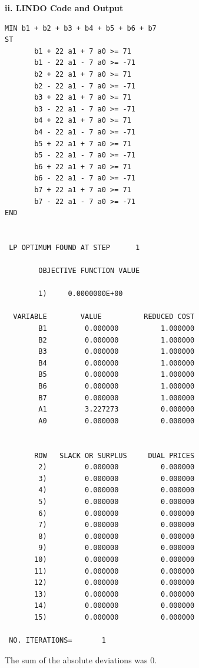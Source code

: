 \documentclass[paper=a4, fontsize=11pt]{scrartcl} %
\numberwithin{equation}{section} %
\numberwithin{figure}{section} %
\numberwithin{table}{section} %
\begin{document}
    \textbf{ii. LINDO Code and Output}\newline
    \begin{verbatim}
MIN b1 + b2 + b3 + b4 + b5 + b6 + b7
ST
	   b1 + 22 a1 + 7 a0 >= 71
	   b1 - 22 a1 - 7 a0 >= -71
	   b2 + 22 a1 + 7 a0 >= 71
	   b2 - 22 a1 - 7 a0 >= -71
	   b3 + 22 a1 + 7 a0 >= 71
	   b3 - 22 a1 - 7 a0 >= -71
	   b4 + 22 a1 + 7 a0 >= 71
	   b4 - 22 a1 - 7 a0 >= -71
	   b5 + 22 a1 + 7 a0 >= 71
	   b5 - 22 a1 - 7 a0 >= -71
	   b6 + 22 a1 + 7 a0 >= 71
	   b6 - 22 a1 - 7 a0 >= -71
	   b7 + 22 a1 + 7 a0 >= 71
	   b7 - 22 a1 - 7 a0 >= -71
END


 LP OPTIMUM FOUND AT STEP      1

        OBJECTIVE FUNCTION VALUE

        1)     0.0000000E+00

  VARIABLE        VALUE          REDUCED COST
        B1         0.000000          1.000000
        B2         0.000000          1.000000
        B3         0.000000          1.000000
        B4         0.000000          1.000000
        B5         0.000000          1.000000
        B6         0.000000          1.000000
        B7         0.000000          1.000000
        A1         3.227273          0.000000
        A0         0.000000          0.000000


       ROW   SLACK OR SURPLUS     DUAL PRICES
        2)         0.000000          0.000000
        3)         0.000000          0.000000
        4)         0.000000          0.000000
        5)         0.000000          0.000000
        6)         0.000000          0.000000
        7)         0.000000          0.000000
        8)         0.000000          0.000000
        9)         0.000000          0.000000
       10)         0.000000          0.000000
       11)         0.000000          0.000000
       12)         0.000000          0.000000
       13)         0.000000          0.000000
       14)         0.000000          0.000000
       15)         0.000000          0.000000

 NO. ITERATIONS=       1
    \end{verbatim}
    
    The sum of the absolute deviations was 0.\newline
    
\end{document}
